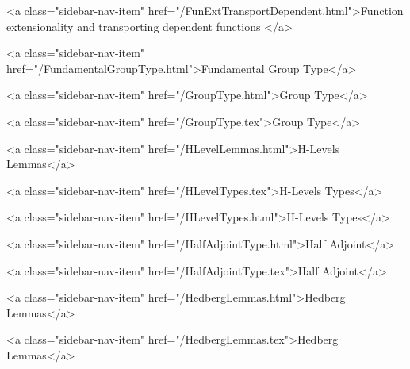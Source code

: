           <a class="sidebar-nav-item" href="/FunExtTransportDependent.html">Function extensionality and transporting dependent functions </a>
        
      
    
      
        
          <a class="sidebar-nav-item" href="/FundamentalGroupType.html">Fundamental Group Type</a>
        
      
    
      
        
          <a class="sidebar-nav-item" href="/GroupType.html">Group Type</a>
        
      
    
      
        
          <a class="sidebar-nav-item" href="/GroupType.tex">Group Type</a>
        
      
    
      
        
          <a class="sidebar-nav-item" href="/HLevelLemmas.html">H-Levels Lemmas</a>
        
      
    
      
        
          <a class="sidebar-nav-item" href="/HLevelTypes.tex">H-Levels Types</a>
        
      
    
      
        
          <a class="sidebar-nav-item" href="/HLevelTypes.html">H-Levels Types</a>
        
      
    
      
        
          <a class="sidebar-nav-item" href="/HalfAdjointType.html">Half Adjoint</a>
        
      
    
      
        
          <a class="sidebar-nav-item" href="/HalfAdjointType.tex">Half Adjoint</a>
        
      
    
      
        
          <a class="sidebar-nav-item" href="/HedbergLemmas.html">Hedberg Lemmas</a>
        
      
    
      
        
          <a class="sidebar-nav-item" href="/HedbergLemmas.tex">Hedberg Lemmas</a>
        
      
    
